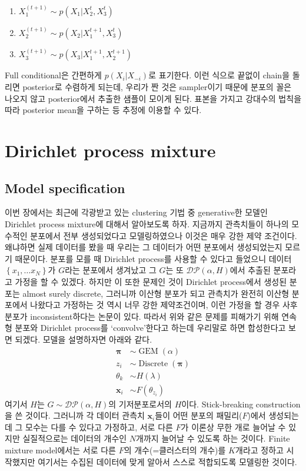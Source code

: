 \documentclass[a4paper, 10pt]{book}
\newcommand{\bs}{\boldsymbol}
\newcommand{\opn}{\operatorname}
\begin{document}
  \begin{enumerate}
  \item $X_{1}^{\left(t+1\right)}\sim p\left(X_{1}|X_{2}^{t}, X_{3}^{t}\right)$
  \item $X_{2}^{\left(t+1\right)}\sim p\left(X_{2}|X_{1}^{t+1}, X_{3}^{t}\right)$
  \item $X_{3}^{\left(t+1\right)}\sim p\left(X_{3}|X_{1}^{t+1}, X_{2}^{t+1}\right)$
  \end{enumerate}
  Full conditional은 간편하게 $p\left(X_{i}|X_{-i}\right)$로 표기한다. 이런 식으로 끝없이 chain을 돌리면 posterior로 수렴하게 되는데, 우리가 짠 것은 sampler이기 때문에 분포의 꼴은 나오지 않고 posterior에서 추출한 샘플이 모이게 된다. 표본을 가지고 강대수의 법칙을 따라 posterior mean을 구하는 등 추정에 이용할 수 있다.

  \chapter{Dirichlet process mixture}
  \section{Model specification}
  이번 장에서는 최근에 각광받고 있는 clustering 기법 중 generative한 모델인 Dirichlet process mixture에 대해서 알아보도록 하자. 지금까지 관측치들이 하나의 모수적인 분포에서 전부 생성되었다고 모델링하였으나 이것은 매우 강한 제약 조건이다. 왜냐하면 실제 데이터를 봤을 때 우리는 그 데이터가 어떤 분포에서 생성되었는지 모르기 때문이다. 분포를 모를 때 Dirichlet process를 사용할 수 있다고 들었으니 데이터 $\left\{x_{1},\ldots x_{N}\right\}$가 $G$라는 분포에서 생겨났고 그 $G$는 또 $\mathcal{DP}\left(\alpha, H\right)$에서 추출된 분포라고 가정을 할 수 있겠다. 하지만 이 또한 문제인 것이 Dirichlet process에서 생성된 분포는 almost surely discrete, 그러니까 이산형 분포가 되고 관측치가 완전히 이산형 분포에서 나왔다고 가정하는 것 역시 너무 강한 제약조건이며, 이런 가정을 할 경우 사후분포가 inconsistent하다는 논문이 있다. 따라서 위와 같은 문제를 피해가기 위해 연속형 분포와 Dirichlet process를 `convolve'한다고 하는데 우리말로 하면 합성한다고 보면 되겠다. 모델을 설명하자면 아래와 같다.
  \begin{align*}
    \bs{\pi} &\sim \opn{GEM}\left(\alpha\right)\\
    z_{i} &\sim \opn{Discrete}\left(\bs{\pi}\right)\\
    \theta_{k} &\sim H\left(\lambda\right)\\
    \bs{x}_{i} &\sim F\left(\theta_{z_{i}}\right)
  \end{align*}
  여기서 $H$는 $G \sim \mathcal{DP}\left(\alpha, H\right)$의 기저분포로서의 $H$이다. Stick-breaking construction을 쓴 것이다. 그러니까 각 데이터 관측치 $\bs{x}_{i}$들이 어떤 분포의 패밀리($F$)에서 생성되는데 그 모수는 다를 수 있다고 가정하고, 서로 다른 $F$가 이론상 무한 개로 늘어날 수 있지만 실질적으로는 데이터의 개수인 $N$개까지 늘어날 수 있도록 하는 것이다. Finite mixture model에서는 서로 다른 $F$의 개수(=클러스터의 개수)를 $K$개라고 정하고 시작했지만 여기서는 수집된 데이터에 맞게 알아서 스스로 적합되도록 모델링한 것이다.
\end{document}
